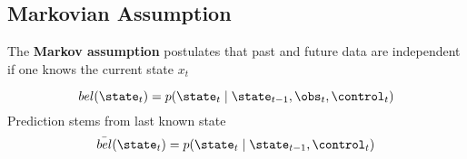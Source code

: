 \subsection{Markovian Assumption}

The \textbf{Markov assumption} postulates that past and future data are independent if one knows the current state $x_t$

\begin{definition}
\begin{equation}
    bel(\state_{t}) = p(\state_{t} \mid \state_{t-1}, \obs_{t}, \control_{t})
\end{equation}
\indent Prediction stems from last known state
\begin{equation}
    \bar{bel}(\state_{t}) = p(\state_{t} \mid \state_{t-1}, \control_{t})
\end{equation}
\end{definition}


